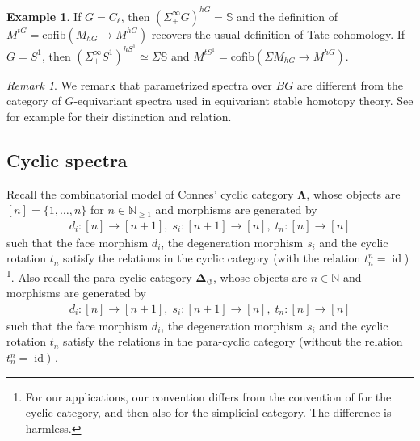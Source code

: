 \documentclass[11pt]{amsart}
\numberwithin{equation}{section}
\theoremstyle{plain}
\theoremstyle{definition}
\newtheorem{eg}[Eg]{Example}
\theoremstyle{remark}
\newtheorem{RMK}[rmk]{Remark}
\newcommand{\bN} { {\mathbb{N}}}
\newcommand{\id}{{\operatorname{id}}}
\begin{document}
\begin{eg}If $G= C_\ell$, then $(\Sigma_+^\infty G)^{hG}=\mathbb{S}$ and the definition of $M^{tG} = \mathrm{cofib}(M_{hG} \to M^{hG}) $ recovers the usual definition of Tate cohomology. If $G=S^1$, then $(\Sigma_+^\infty S^1)^{hS^1}\simeq \Sigma \mathbb{S}$ and $M^{tS^1} = \mathrm{cofib}(\Sigma M_{hG} \to M^{hG}).$
\end{eg}









\begin{RMK}
We remark that parametrized spectra over $BG$ are different from the category of $G$-equivariant spectra used in equivariant stable homotopy theory. See for example \cite[Section II.2]{Nikolaus-Scholze-Ontopologicalcyclichomology} for their distinction and relation.
\end{RMK}





\subsection{Cyclic spectra}

Recall the combinatorial model of Connes' cyclic category $\boldsymbol{\Lambda}$, whose objects are $[n]=\{1,\dots,n\} $ for $n\in \bN_{\geq 1}$  and morphisms are generated by
\begin{align*}
    d_i: [n] \to [n+1], \;s_i: [n+1] \to [n], \;t_{n}: [n] \to [n]
\end{align*}
such that the face morphism $d_i$, the degeneration morphism $s_i$ and the cyclic rotation $t_n$ satisfy the relations in the cyclic category (with the relation $t_n^{n} = \id$) \cite[Definition 6.1.1]{LodayCyclic}\footnote{For our applications, our convention differs from the convention of \cite[Definition 6.1.1]{LodayCyclic} for the cyclic category, and then also for the simplicial category. The difference is harmless.}. Also recall the para-cyclic category $\boldsymbol{\Delta}_\circlearrowleft$, whose objects are $n \in \bN$ and morphisms are generated by
\begin{align*}
    d_i: [n] \to [n+1], \;s_i: [n+1] \to [n], \;t_{n}: [n] \to [n]
\end{align*}
such that the face morphism $d_i$, the degeneration morphism $s_i$ and the cyclic rotation $t_n$ satisfy the relations in the para-cyclic category (without the relation $t_n^n = \id$) \cite[Section 1]{Getzler-Jones} \cite[Lecture 4]{Kaledin}.
\end{document}

